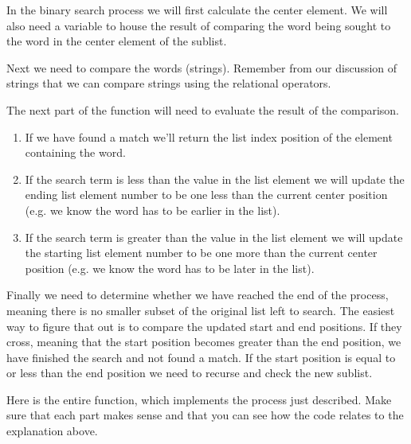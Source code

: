 In the binary search process we will first calculate the center element. We will also need a variable to house the result of comparing the word being sought to the word in the center element of the sublist.

Next we need to compare the words (strings). Remember from our discussion of strings that we can compare strings using the relational operators.

The next part of the function will need to evaluate the result of the comparison.

\begin{enumerate}
	\item If we have found a match we'll return the list index position of the element containing the word. 
	\item If the search term is less than the value in the list element we will update the ending list element number to be one less than the current center position (e.g. we know the word has to be earlier in the list).
	\item If the search term is greater than the value in the list element we will update the starting list element number to be one more than the current center position (e.g. we know the word has to be later in the list).
\end{enumerate}

Finally we need to determine whether we have reached the end of the process, meaning there is no smaller subset of the original list left to search. The easiest way to figure that out is to compare the updated start and end positions. If they cross, meaning that the start position becomes greater than the end position, we have finished the search and not found a match. If the start position is equal to or less than the end position we need to recurse and check the new sublist.

Here is the entire function, which implements the process just described. Make sure that each part makes sense and that you can see how the code relates to the explanation above.

